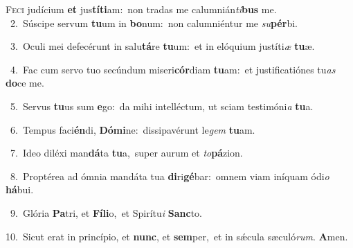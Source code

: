 \lettrine{\initial\textcolor{\initialcolor}{F}}{eci} judícium \textbf{et} jus\-\textbf{tí}\-\textbf{ti}am:~\star non tradas me calumnián\-\textit{ti}\-\textbf{bus} me.\\
{\numbfont\textcolor{\numbcolor}{~2.}}~Súscipe servum \textbf{tu}\-um in \textbf{bo}\-num:~\star non calumniéntur me \textit{su}\-\textbf{pér}bi.\par
{\numbfont\textcolor{\numbcolor}{~3.}}~Oculi mei defecérunt in salu\-\textbf{tá}\-re \textbf{tu}\-um:~\star et in elóquium justíti\textit{æ} \textbf{tu}\-æ.\par
{\numbfont\textcolor{\numbcolor}{~4.}}~Fac cum servo tuo secúndum miseri\-\textbf{cór}\-diam \textbf{tu}\-am:~\star et justificatiónes tu\textit{as} \textbf{do}\-ce me.\par
{\numbfont\textcolor{\numbcolor}{~5.}}~Servus \textbf{tu}\-us sum \textbf{e}\-go:~\star da mihi intelléctum, ut sciam testimóni\textit{a} \textbf{tu}\-a.\par
{\numbfont\textcolor{\numbcolor}{~6.}}~Tempus faci\-\textbf{én}\-di, \textbf{Dó}\-\textbf{mi}ne:~\star dissipavérunt le\textit{gem} \textbf{tu}\-am.\par
{\numbfont\textcolor{\numbcolor}{~7.}}~Ideo diléxi man\-\textbf{dá}\-ta \textbf{tu}\-a,~\star super aurum et \textit{to}\-\textbf{pá}zion.\par
{\numbfont\textcolor{\numbcolor}{~8.}}~Proptérea ad ómnia mandáta tua \textbf{di}\-ri\-\textbf{gé}\-bar:~\star omnem viam iníquam ódi\textit{o} \textbf{há}\-bui.\par
{\numbfont\textcolor{\numbcolor}{~9.}}~Glória \textbf{Pa}\-tri, et \textbf{Fí}\-\textbf{li}o,~\star et Spirítu\textit{i} \textbf{Sanc}\-to.\par
{\numbfont\textcolor{\numbcolor}{10.}}~Sicut erat in princípio, et \textbf{nunc}\-, et \textbf{sem}\-per,~\star et in sǽcula sæculó\-\textit{rum}\-. \textbf{A}\-men.\par
